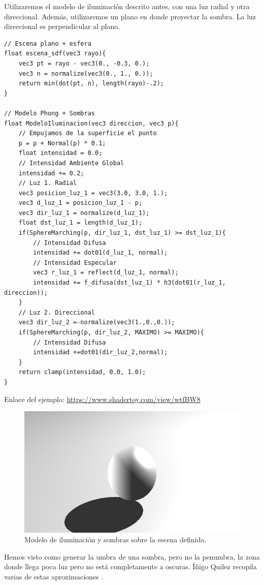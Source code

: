 Utilizaremos el modelo de iluminación descrito antes, con una luz radial y otra direccional. Además, utilizaremos un plano en donde proyectar la sombra. La luz direccional es perpendicular al plano.\\
\begin{lstlisting}
// Escena plano + esfera
float escena_sdf(vec3 rayo){
    vec3 pt = rayo - vec3(0., -0.3, 0.);
    vec3 n = normalize(vec3(0., 1., 0.));
    return min(dot(pt, n), length(rayo)-.2);
}

// Modelo Phong + Sombras
float ModeloIluminacion(vec3 direccion, vec3 p){
    // Empujamos de la superficie el punto 
    p = p + Normal(p) * 0.1;
    float intensidad = 0.0;
    // Intensidad Ambiente Global
    intensidad += 0.2;
    // Luz 1. Radial
    vec3 posicion_luz_1 = vec3(3.0, 3.0, 1.);
    vec3 d_luz_1 = posicion_luz_1 - p;
    vec3 dir_luz_1 = normalize(d_luz_1);
    float dst_luz_1 = length(d_luz_1);
    if(SphereMarching(p, dir_luz_1, dst_luz_1) >= dst_luz_1){
        // Intensidad Difusa
        intensidad += dot01(d_luz_1, normal);
        // Intensidad Especular
        vec3 r_luz_1 = reflect(d_luz_1, normal);
        intensidad += f_difusa(dst_luz_1) * h3(dot01(r_luz_1, direccion));
    }
    // Luz 2. Direccional
    vec3 dir_luz_2 =-normalize(vec3(1.,0.,0.));
    if(SphereMarching(p, dir_luz_2, MAXIMO) >= MAXIMO){
        // Intensidad Difusa
        intensidad +=dot01(dir_luz_2,normal);
    }
    return clamp(intensidad, 0.0, 1.0);
}
\end{lstlisting}

Enlace del ejemplo: \url{https://www.shadertoy.com/view/wtfBW8}

\begin{figure}[H]
  \centering
  \captionsetup{justification=centering}%
  \includegraphics[width=1.0\textwidth]{secciones/imagenes/lightmodel/sombra_dura.png}
  \caption{Modelo de iluminación y sombras sobre la escena definida.}
  \label{fig:shadow}
\end{figure}

Hemos visto como generar la umbra de una sombra, pero no la penumbra, la zona donde llega poca luz pero no está completamente a oscuras. Íñigo Quilez recopila varias de estas aproximaciones \cite{softshadows}.


\newpage
